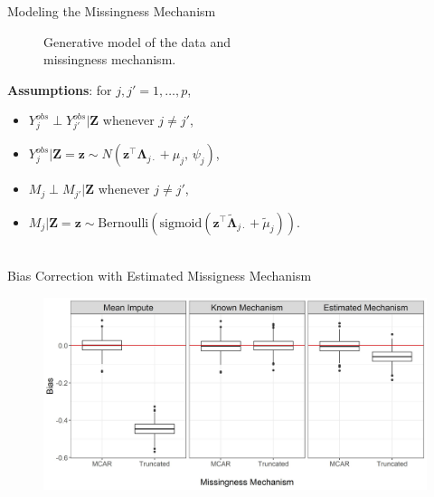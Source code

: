 \documentclass[aspectratio=169,xcolor=dvipsnames]{beamer}
\begin{document}
\begin{frame}{Modeling the Missingness Mechanism}
    \noindent\begin{minipage}[t]{0.48\linewidth}
    \begin{figure}
        \caption{Generative model of the data and \\missingness mechanism.}
    \end{figure}
    \end{minipage}
    \fontsize{10pt}{10}\selectfont
    \noindent\begin{minipage}[t]{0.48\linewidth}
\vspace{1cm}
\noindent \textbf{Assumptions}: for $j, j'=1, \dots, p$, 
\vspace{.5cm}
    \begin{itemize}
        \item $Y_j^{obs} \perp Y_{j'}^{obs}|\boldsymbol Z$ whenever $j\neq j'$,
        \item $Y_j^{obs}|\boldsymbol Z = \boldsymbol z \sim N(\boldsymbol z^\top \boldsymbol \Lambda_{j\cdot} + \mu_j,\, \psi_j)$,
        \vspace{.3cm}
        \item $M_{j} \perp M_{j'}|\boldsymbol Z$ whenever $j\neq j'$,
        \item $M_{j}|\boldsymbol Z = \boldsymbol z \sim \text{Bernoulli}(\text{sigmoid}(\boldsymbol z^\top \widetilde{\boldsymbol \Lambda}_{j\cdot} + \widetilde{\mu}_j))$.
    \end{itemize}   
    \begin{align*}
    \end{align*}
    \end{minipage}
\end{frame}

\begin{frame}{Bias Correction with Estimated Missigness Mechanism}
    \begin{figure}
        \centering
        \includegraphics[width=.95\textwidth]{images/plot_bias_3.jpg}
    \end{figure}
\end{frame}
\end{document}

